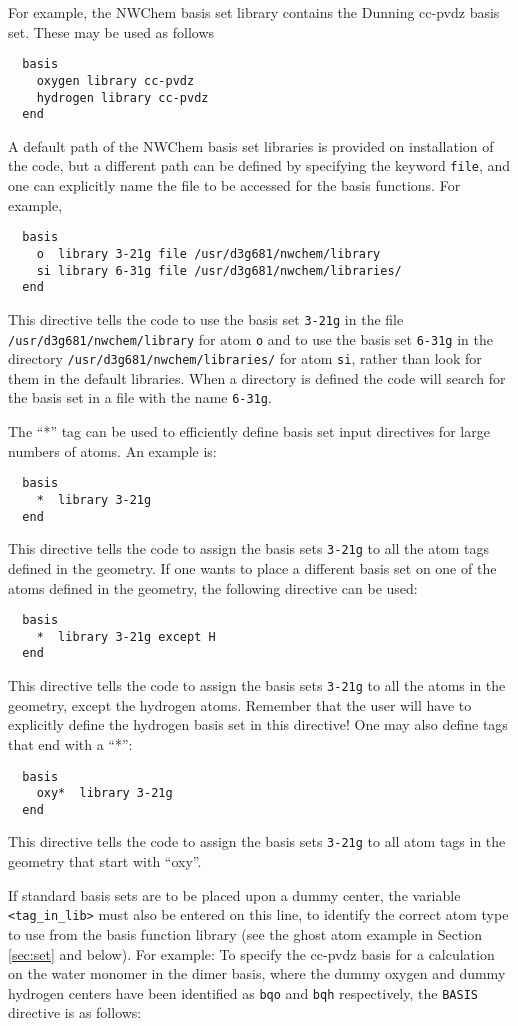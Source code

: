 For example, the NWChem basis set library contains the Dunning cc-pvdz
basis set.  These may be used as follows
\begin{verbatim}
  basis
    oxygen library cc-pvdz
    hydrogen library cc-pvdz
  end
\end{verbatim}

A default path of the NWChem basis set libraries is provided on installation 
of the code, but a different path can be defined by specifying the keyword 
\verb+file+, and one can explicitly name the file to be accessed
for the basis functions. For example,
\begin{verbatim}
  basis
    o  library 3-21g file /usr/d3g681/nwchem/library
    si library 6-31g file /usr/d3g681/nwchem/libraries/
  end
\end{verbatim}
This directive tells the code to use the basis set \verb+3-21g+ in
the file {\tt /usr/\-d3g681/\-nwchem/\-library} for atom \verb+o+ and
to use the basis set \verb+6-31g+ in the directory 
{\tt /usr/\-d3g681/\-nwchem/\-libraries/} for atom \verb+si+, rather 
than look for them in the default libraries. When a directory is defined 
the code will search for the basis set in a file with the name {\tt 6-31g}.

The ``*'' tag can be used to efficiently define basis set input directives 
for large numbers of atoms. An example is:
\begin{verbatim}
  basis
    *  library 3-21g
  end
\end{verbatim}
This directive tells the code to assign the basis sets \verb+3-21g+ to
all the atom tags defined in the geometry. If one wants to place a
different basis set on one of the atoms defined in the geometry, the 
following directive can be used:
\begin{verbatim}
  basis
    *  library 3-21g except H
  end
\end{verbatim}
This directive tells the code to assign the basis sets \verb+3-21g+ to
all the atoms in the geometry, except the hydrogen atoms. Remember that 
the user will have to explicitly define the hydrogen basis set in this
directive! One may also define tags that end with a ``*'': 
\begin{verbatim}
  basis
    oxy*  library 3-21g 
  end
\end{verbatim}
This directive tells the code to assign the basis sets \verb+3-21g+ to 
all atom tags in the geometry that start with ``oxy''.

If standard basis sets are to be placed upon a dummy center, the
variable \verb+<tag_in_lib>+ must also be entered on this line, to
identify the correct atom type to use from the basis function library
(see the ghost atom example in Section \ref{sec:set} and below).  For
example: To specify the cc-pvdz basis for a calculation on the water
monomer in the dimer basis, where the dummy oxygen and dummy hydrogen
centers have been identified as \verb+bqo+ and \verb+bqh+
respectively, the \verb+BASIS+ directive is as follows:

